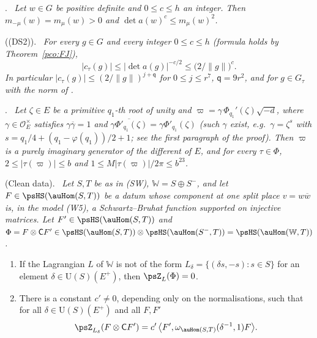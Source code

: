 \documentclass[10pt]{amsart}
\theoremstyle{definition}
\theoremstyle{remark}
\providecommand{\auO}{\mathcal O}
\providecommand{\auPl}{\Phi}
\providecommand{\auU}{\mathrm U}
\providecommand{\aubar}[1]{\overline{#1}}
\providecommand{\pbeq}{\mathsf q}
\providecommand{\pcW}{\mathbb W}
\providecommand{\pdsm}{m}
\newenvironment{quotedthm}[2]{\par\medskip\noindent\begingroup
  \textbf{#1}#2.\ \itshape\ignorespaces}{\endgroup\par\medskip}
\begin{document}
\begin{quotedthm}{\cite[Lemma~5.5]{P51}}{}
Let $w\in G$ be positive definite and $0\le c\le h$ an integer. Then $\pdsm_{-\mu}(w)=\pdsm_\mu(w)>0$
and $\det a(w)^c\le\pdsm_\mu(w)^2$.
\end{quotedthm}

\begin{quotedthm}{\cite[Theorem~5.6]{P51}}{ (\textup{(DS2)})}
For every $g\in G$ and every integer $0\le c\le h$ (formula {\cite[(59)]{P51}} holds by Theorem~\ref{pco:FJ}),
\[
|c_\tau(g)|\le|\det a(g)|^{-c/2}\le\bigl(2/\|g\|\bigr)^c .
\]
In particular $|c_\tau(g)|\le(2/\|g\|)^{j+\pbeq}$ for $0\le j\le r^7$, $\pbeq=9r^2$, and for $g\in
G_\tau$ with the norm of {\cite[\S3.2.1]{P51}}.
\end{quotedthm}

\begin{quotedthm}{\cite[Lemma~5.10]{P51}}{}
Let $\zeta\in E$ be a primitive $q_1$-th root of unity and $\varpi=\gamma\,\Phi_{q_1}'(\zeta)\sqrt{-d}$,
where $\gamma\in\auO_E^\times$ satisfies $\gamma\aubar\gamma=1$ and $\aubar{\gamma\Phi'_{q_1}(\zeta)}=
\gamma\Phi'_{q_1}(\zeta)$ \textup{(}such $\gamma$ exist, e.g.\ $\gamma=\zeta^s$ with
$s=q_1/4+(q_1-\varphi(q_1))/2+1$; see the first paragraph of the proof\textup{)}. Then $\varpi$ is a purely imaginary generator of the different of $E$, and
for every $\tau\in\auPl$, $2\le|\tau(\varpi)|\le b$ and $1\le M|\tau(\varpi)|/2\pi\le b^{23}$.
\end{quotedthm}

\begin{quotedthm}{\cite[Lemma~2.14]{P53}}{ (Clean data)}
Let $S,T$ be as in \textup{(SW)}, $\pcW=S\oplus S^-$, and let $F\in\psHS(\auHom(S,T))$ be a datum
whose component at one split place $v=w\aubar w$ is, in the model \textup{(W5)}, a Schwartz--Bruhat
function supported on injective matrices. Let $F'\in\psHS(\auHom(S,T))$ and
$\Phi=F\otimes\mathsf CF'\in\psHS(\auHom(S,T))\otimes\psHS(\auHom(S^-,T))=\psHS(\auHom(\pcW,T))$.
\begin{enumerate}
\item[(a)] If the Lagrangian $L$ of $\pcW$ is not of the form $L_\delta=\{(\delta s,-s):s\in S\}$
for an element $\delta\in\auU(S)(E^+)$, then $\psZ_L(\Phi)=0$.
\item[(b)] There is a constant $c'\ne0$, depending only on the normalisations, such that for all
$\delta\in\auU(S)(E^+)$ and all $F,F'$
\[
\psZ_{L_\delta}(F\otimes\mathsf CF')=c'\,\bigl\langle F',\omega_{\auHom(S,T)}(\delta^{-1},1)F\bigr
\rangle .
\]
\end{enumerate}
\end{quotedthm}
\end{document}
